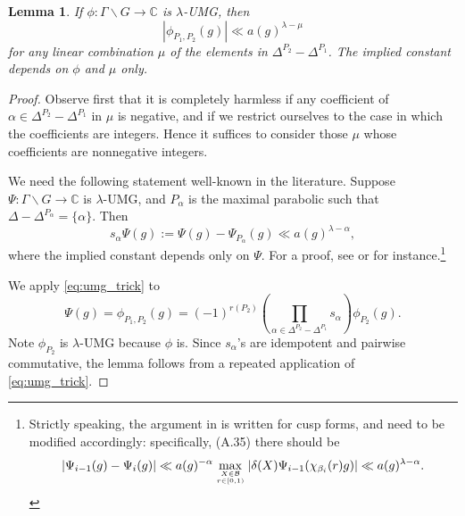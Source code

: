 \documentclass[11pt]{amsart}
\newtheorem{lemma}[theorem]{Lemma}
\numberwithin{theorem}{section}
\numberwithin{equation}{section}
\theoremstyle{remark}
\theoremstyle{definition}
\newcommand{\C}{\mathbb{C}}
\newcommand{\ga}{\mathfrak{a}}
\begin{document}
\begin{lemma} \label{lemma:umg2}
If $\phi:\Gamma \backslash G \rightarrow \C$ is $\lambda$-UMG, then 
\begin{equation*}
|\phi_{P_1,P_2}(g)| \ll a(g)^{\lambda-\mu}
\end{equation*} for any linear combination $\mu$ of the elements in $\Delta^{P_2} - \Delta^{P_1}$. The implied constant depends on $\phi$ and $\mu$ only.
\end{lemma}
\begin{proof}
Observe first that it is completely harmless if any coefficient of $\alpha \in \Delta^{P_2} - \Delta^{P_1}$ in $\mu$ is negative, and if we restrict ourselves to the case in which the coefficients are integers. Hence it suffices to consider those $\mu$ whose coefficients are nonnegative integers.

We need the following statement well-known in the literature. Suppose $\Psi:\Gamma \backslash G \rightarrow \C$ is $\lambda$-UMG, and $P_\alpha$ is the maximal parabolic such that $\Delta - \Delta^{P_\alpha} = \{\alpha\}$. Then
\begin{equation} \label{eq:umg_trick}
s_\alpha\Psi(g) := \Psi(g) - \Psi_{P_\alpha}(g) \ll a(g)^{\lambda-\alpha},
\end{equation}
where the implied constant depends only on $\Psi$. 
For a proof, see \cite[8.3.6]{Gar18} or \cite[A.3.3]{GMP17} for instance.\footnote{Strictly speaking, the argument in \cite{GMP17} is written for cusp forms, and need to be modified accordingly: specifically, (A.35) there should be
\begin{equation*}
|\Psi_{i-1}(g) - \Psi_i(g)| \ll a(g)^{-\alpha}\max_{X \in \mathcal B \atop r \in [0,1)}|\delta(X)\Psi_{i-1}(\chi_{\beta_i}(r)g)| \ll a(g)^{\lambda-\alpha}.
\end{equation*}}

We apply \eqref{eq:umg_trick} to
\begin{equation*}
\Psi(g) = \phi_{P_1,P_2}(g) = (-1)^{r(P_2)}\left(\prod_{\alpha \in \Delta^{P_2}-\Delta^{P_1}} s_\alpha\right)\phi_{P_2}(g).
\end{equation*}
Note $\phi_{P_2}$ is $\lambda$-UMG because $\phi$ is.
Since $s_\alpha$'s are idempotent and pairwise commutative, the lemma follows from a repeated application of \eqref{eq:umg_trick}.
\end{proof}
\end{document}
